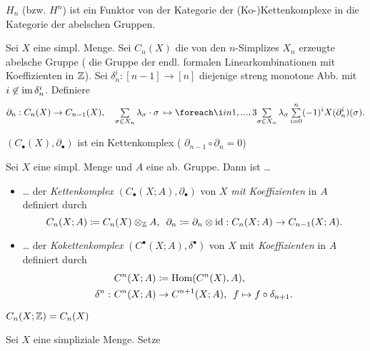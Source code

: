 \documentclass{cheat-sheet}
\newcommand{\nspace}[1]{\foreach \i in {1,...,#1}{ \! }} %
\begin{document}
\begin{prop}
  $H_n$ (bzw. $H^n$) ist ein Funktor von der Kategorie der (Ko-)Kettenkomplexe in die Kategorie der abelschen Gruppen.
\end{prop}

\begin{defn}
  Sei $X$ eine simpl. Menge. Sei $C_n(X)$ die von den $n$-Simplizes $X_n$ erzeugte abelsche Gruppe (\dh{} die Gruppe der endl. formalen Linearkombinationen mit Koeffizienten in $\mathbb{Z}$). Sei $\delta_n^i : [n{-}1] \to [n]$ diejenige streng monotone Abb. mit $i \not\in \operatorname{im} \delta_n^i$. Definiere
  \[
    \partial_n : C_n(X) \to C_{n-1}(X), \quad
    \sum_{\sigma \in X_n} \lambda_\sigma \cdot \sigma \, \mapsto \nspace{3} \sum_{\sigma \in X_n} \lambda_\sigma \sum_{i=0}^n (-1)^i X(\partial_n^i)(\sigma).
  \]
\end{defn}

\begin{prop}
  $(C_\bullet(X),\partial_\bullet)$ ist ein Kettenkomplex (\dh{} $\partial_{n-1} \circ \partial_n = 0$)
\end{prop}

\begin{defn}
  Sei $X$ eine simpl. Menge und $A$ eine ab. Gruppe. Dann ist \ldots
  \begin{itemize}
    \item \ldots{} der \emph{Kettenkomplex} $(C_\bullet(X; A), \partial_\bullet)$ von $X$ \emph{mit Koeffizienten} in $A$ definiert durch
    \[
      C_n(X; A) \coloneqq C_n(X) \otimes_{\mathbb{Z}} A, \enspace
      \partial_n \coloneqq \partial_n \otimes \operatorname{id} : C_n(X; A) \to C_{n-1}(X; A).
    \]
    \item \ldots{} der \emph{Kokettenkomplex} $(C^\bullet(X; A), \delta^\bullet)$ von $X$ mit \emph{Koeffizienten} in $A$ definiert durch
    \begin{align*}
      & C^n(X; A) \coloneqq \operatorname{Hom}(C^n(X), A), \\
      \delta^n : \,\, & C^n(X; A) \to C^{n+1}(X; A), \enspace f \mapsto f \circ \delta_{n+1}.
    \end{align*}
  \end{itemize}
\end{defn}

\begin{beob}
  $C_n(X; \mathbb{Z}) = C_n(X)$
\end{beob}

\begin{nota}
  Sei $X$ eine simpliziale Menge. Setze
  \begin{itemize}
  \end{itemize}
\end{nota}
\end{document}
